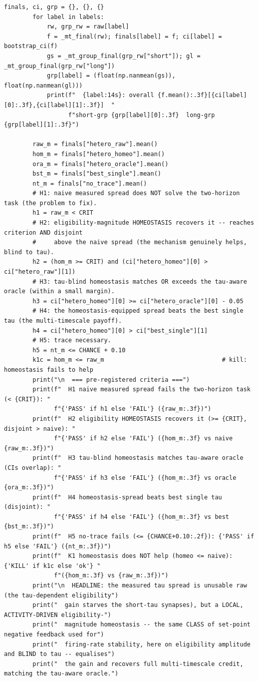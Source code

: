 \begin{lstlisting}[caption={mrl\_trace/extensions.py},label={lst:siox-src-extensions}]
        finals, ci, grp = {}, {}, {}
        for label in labels:
            rw, grp_rw = raw[label]
            f = _mt_final(rw); finals[label] = f; ci[label] = bootstrap_ci(f)
            gs = _mt_group_final(grp_rw["short"]); gl = _mt_group_final(grp_rw["long"])
            grp[label] = (float(np.nanmean(gs)), float(np.nanmean(gl)))
            print(f"  {label:14s}: overall {f.mean():.3f}[{ci[label][0]:.3f},{ci[label][1]:.3f}]  "
                  f"short-grp {grp[label][0]:.3f}  long-grp {grp[label][1]:.3f}")

        raw_m = finals["hetero_raw"].mean()
        hom_m = finals["hetero_homeo"].mean()
        ora_m = finals["hetero_oracle"].mean()
        bst_m = finals["best_single"].mean()
        nt_m = finals["no_trace"].mean()
        # H1: naive measured spread does NOT solve the two-horizon task (the problem to fix).
        h1 = raw_m < CRIT
        # H2: eligibility-magnitude HOMEOSTASIS recovers it -- reaches criterion AND disjoint
        #     above the naive spread (the mechanism genuinely helps, blind to tau).
        h2 = (hom_m >= CRIT) and (ci["hetero_homeo"][0] > ci["hetero_raw"][1])
        # H3: tau-blind homeostasis matches OR exceeds the tau-aware oracle (within a small margin).
        h3 = ci["hetero_homeo"][0] >= ci["hetero_oracle"][0] - 0.05
        # H4: the homeostasis-equipped spread beats the best single tau (the multi-timescale payoff).
        h4 = ci["hetero_homeo"][0] > ci["best_single"][1]
        # H5: trace necessary.
        h5 = nt_m <= CHANCE + 0.10
        k1c = hom_m <= raw_m                                 # kill: homeostasis fails to help
        print("\n  === pre-registered criteria ===")
        print(f"  H1 naive measured spread fails the two-horizon task (< {CRIT}): "
              f"{'PASS' if h1 else 'FAIL'} ({raw_m:.3f})")
        print(f"  H2 eligibility HOMEOSTASIS recovers it (>= {CRIT}, disjoint > naive): "
              f"{'PASS' if h2 else 'FAIL'} ({hom_m:.3f} vs naive {raw_m:.3f})")
        print(f"  H3 tau-blind homeostasis matches tau-aware oracle (CIs overlap): "
              f"{'PASS' if h3 else 'FAIL'} ({hom_m:.3f} vs oracle {ora_m:.3f})")
        print(f"  H4 homeostasis-spread beats best single tau (disjoint): "
              f"{'PASS' if h4 else 'FAIL'} ({hom_m:.3f} vs best {bst_m:.3f})")
        print(f"  H5 no-trace fails (<= {CHANCE+0.10:.2f}): {'PASS' if h5 else 'FAIL'} ({nt_m:.3f})")
        print(f"  K1 homeostasis does NOT help (homeo <= naive): {'KILL' if k1c else 'ok'} "
              f"({hom_m:.3f} vs {raw_m:.3f})")
        print("\n  HEADLINE: the measured tau spread is unusable raw (the tau-dependent eligibility")
        print("  gain starves the short-tau synapses), but a LOCAL, ACTIVITY-DRIVEN eligibility-")
        print("  magnitude homeostasis -- the same CLASS of set-point negative feedback used for")
        print("  firing-rate stability, here on eligibility amplitude and BLIND to tau -- equalises")
        print("  the gain and recovers full multi-timescale credit, matching the tau-aware oracle.")


\end{lstlisting}
